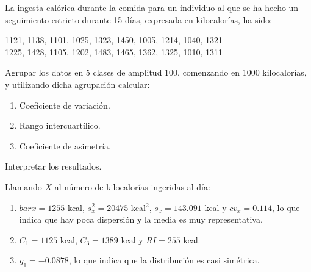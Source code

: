 { La ingesta calórica durante la comida para un individuo al que se ha hecho un seguimiento estricto durante 15 días, expresada en
kilocalorías, ha sido:
\begin{center}
1121, 1138, 1101, 1025, 1323, 1450, 1005, 1214, 1040, 1321 \\
1225, 1428, 1105, 1202, 1483, 1465, 1362, 1325, 1010, 1311
\end{center}
Agrupar los datos en 5 clases de amplitud 100, comenzando en 1000 kilocalorías, y utilizando dicha agrupación calcular: 
\begin{enumerate}
\item Coeficiente de variación.
\item Rango intercuartílico.
\item Coeficiente de asimetría.
\end{enumerate}
Interpretar los resultados.
}
{Llamando $X$ al número de kilocalorías ingeridas al día:
\begin{enumerate}
\item $bar x= 1255$ kcal, $s_x^2=20475$ kcal$^2$, $s_x=143.091$ kcal y $cv_x=0.114$, lo que indica que hay poca dispersión y la media es
muy representativa.
\item $C_1=1125$ kcal, $C_3=1389$ kcal y $RI=255$ kcal.
\item $g_{1}=-0.0878$, lo que indica que la distribución es casi simétrica.
\end{enumerate}
}
